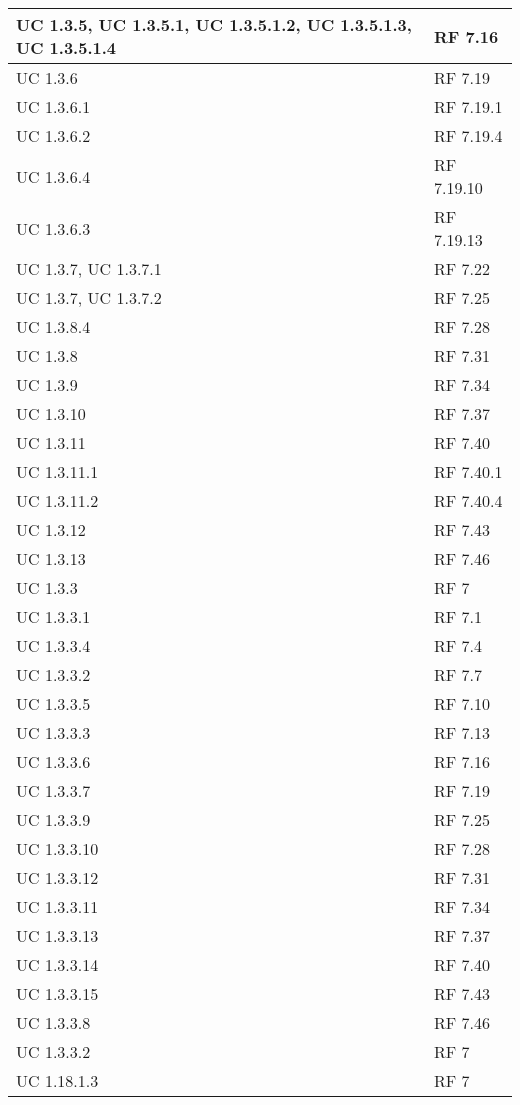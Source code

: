 {\begin{longtable} [c]{| p{4cm} | p{4cm} |}
 \hline 
UC 1.3.5, UC 1.3.5.1, UC 1.3.5.1.2, UC 1.3.5.1.3, UC 1.3.5.1.4 & RF 7.16\\ 
 \hline 
UC 1.3.6 & RF 7.19\\ 
 \hline 
UC 1.3.6.1 & RF 7.19.1\\ 
 \hline 
UC 1.3.6.2 & RF 7.19.4\\ 
 \hline 
UC 1.3.6.4 & RF 7.19.10\\ 
 \hline 
UC 1.3.6.3 & RF 7.19.13\\ 
 \hline 
UC 1.3.7, UC 1.3.7.1 & RF 7.22\\ 
 \hline 
UC 1.3.7, UC 1.3.7.2 & RF 7.25\\ 
 \hline 
UC 1.3.8.4 & RF 7.28\\ 
 \hline 
UC 1.3.8 & RF 7.31\\ 
 \hline 
UC 1.3.9 & RF 7.34\\ 
 \hline 
UC 1.3.10 & RF 7.37\\ 
 \hline 
UC 1.3.11 & RF 7.40\\ 
 \hline 
UC 1.3.11.1 & RF 7.40.1\\ 
 \hline 
UC 1.3.11.2 & RF 7.40.4\\ 
 \hline 
UC 1.3.12 & RF 7.43\\ 
 \hline 
UC 1.3.13 & RF 7.46\\ 
 \hline 
UC 1.3.3 & RF 7\\ 
 \hline 
UC 1.3.3.1 & RF 7.1\\ 
 \hline 
UC 1.3.3.4 & RF 7.4\\ 
 \hline 
UC 1.3.3.2 & RF 7.7\\ 
 \hline 
UC 1.3.3.5 & RF 7.10\\ 
 \hline 
UC 1.3.3.3 & RF 7.13\\ 
 \hline 
UC 1.3.3.6 & RF 7.16\\ 
 \hline 
UC 1.3.3.7 & RF 7.19\\ 
 \hline 
UC 1.3.3.9 & RF 7.25\\ 
 \hline 
UC 1.3.3.10 & RF 7.28\\ 
 \hline 
UC 1.3.3.12 & RF 7.31\\ 
 \hline 
UC 1.3.3.11 & RF 7.34\\ 
 \hline 
UC 1.3.3.13 & RF 7.37\\ 
 \hline 
UC 1.3.3.14 & RF 7.40\\ 
 \hline 
UC 1.3.3.15 & RF 7.43\\ 
 \hline 
UC 1.3.3.8 & RF 7.46\\ 
 \hline 
UC 1.3.3.2 & RF 7\\ 
 \hline 
UC 1.18.1.3 & RF 7\\ 

\end{longtable}}

